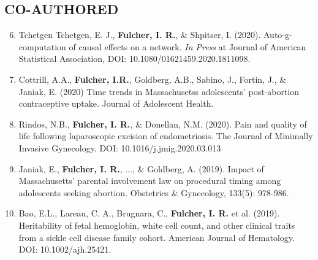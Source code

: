 \documentclass[12pt]{article}
\begin{document}
\subsection*{\textbf{CO-AUTHORED}}
\begin{enumerate} 
	\setcounter{enumi}{5}
	
	
	
		
	\item Tchetgen Tchetgen, E. J., \textbf{Fulcher, I. R.}, \& Shpitser, I. (2020). Auto-g-computation of causal effects on a network. \textit{In Press} at Journal of American Statistical Association, DOI: 10.1080/01621459.2020.1811098.
	
	\item Cottrill, A.A., \textbf{Fulcher, I.R.}, Goldberg, A.B., Sabino, J., Fortin, J., \& Janiak, E. (2020) Time trends in Massachusetss adolescents' post-abortion contraceptive uptake. Journal of Adolescent Health. 
	
	\item Rindos, N.B., \textbf{Fulcher, I. R.}, \& Donellan, N.M. (2020). Pain and quality of life following laparoscopic excision of endometriosis. The Journal of Minimally Invasive Gynecology. DOI: 10.1016/j.jmig.2020.03.013
	
	\item Janiak, E., \textbf{Fulcher, I. R.}, ..., \& Goldberg, A. (2019). Impact of Massachusetts' parental involvement law on procedural timing among adolescents seeking abortion. Obstetrics \& Gynecology, 133(5): 978-986.
	
	\item Bao, E.L., Lareau, C. A., Brugnara, C., \textbf{Fulcher, I. R.} et al. (2019). Heritability of fetal hemoglobin, white cell count, and other clinical traits from a sickle cell disease family cohort. American Journal of Hematology. DOI: 10.1002/ajh.25421. 
	
\end{enumerate}


\end{document}
